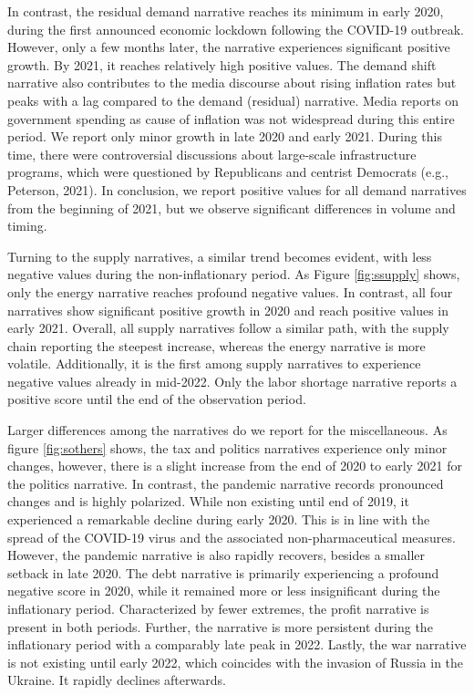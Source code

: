 In contrast, the residual demand narrative reaches its minimum in early 2020, during the first announced economic lockdown following the COVID-19 outbreak. However, only a few months later, the narrative experiences significant positive growth. By 2021, it reaches relatively high positive values. The demand shift narrative also contributes to the media discourse about rising inflation rates but peaks with a lag compared to the demand (residual) narrative. Media reports on government spending as cause of inflation was not widespread during this entire period. We report only minor growth in late 2020 and early 2021. During this time, there were controversial discussions about large-scale infrastructure programs, which were questioned by Republicans and centrist Democrats (e.g., Peterson, 2021). In conclusion, we report positive values for all demand narratives from the beginning of 2021, but we observe significant differences in volume and timing.

Turning to the supply narratives, a similar trend becomes evident, with less negative values during the non-inflationary period. As Figure \ref{fig:ssupply} shows, only the energy narrative reaches profound negative values. In contrast, all four narratives show significant positive growth in 2020 and reach positive values in early 2021. Overall, all supply narratives follow a similar path, with the supply chain reporting the steepest increase, whereas the energy narrative is more volatile. Additionally, it is the first among supply narratives to experience negative values already in mid-2022. Only the labor shortage narrative reports a positive score until the end of the observation period.

Larger differences among the narratives do we report for the miscellaneous. As figure \ref{fig:sothers} shows, the tax and politics narratives experience only minor changes, however, there is a slight increase from the end of 2020 to early 2021 for the politics narrative. In contrast, the pandemic narrative records pronounced changes and is highly polarized. While non existing until end of 2019, it experienced a remarkable decline during early 2020. This is in line with the spread of the COVID-19 virus and the associated non-pharmaceutical measures. However, the pandemic narrative is also rapidly recovers, besides a smaller setback in late 2020. The debt narrative is primarily experiencing a profound negative score in 2020, while it remained more or less insignificant during the inflationary period. Characterized by fewer extremes, the profit narrative is present in both periods. Further, the narrative is more persistent during the inflationary period with a comparably late peak in 2022. Lastly, the war narrative is not existing until early 2022, which coincides with the invasion of Russia in the Ukraine. It rapidly declines afterwards.


